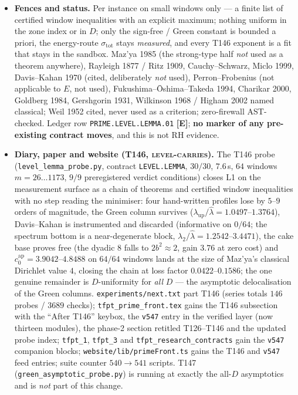 \documentclass[11pt]{article}
\providecommand{\mE}{\textbf{[E]}}\providecommand{\mC}{\textbf{[C]}}
\begin{document}
\begin{itemize}[leftmargin=1.5em]
stays flat (max/min $1.0063$; control: $c_0^{\mathrm{ap}}\times10^{-3}$ breaks the certificate on
every window).
\item \textbf{Fences and status.} Per instance on small windows only --- a finite list of certified
window inequalities with an explicit maximum; nothing uniform in the zone index or in $D$; only the
sign-free / Green constant is bounded a priori, the energy-route $\sigma_{\mathrm{tot}}$ stays
\emph{measured}, and every T146 exponent is a fit that stays in the sandbox. Maz'ya 1985 (the
strong-type half \emph{not} used as a theorem anywhere), Rayleigh 1877 / Ritz 1909, Cauchy--Schwarz,
Miclo 1999, Davis--Kahan 1970 (cited, deliberately \emph{not} used), Perron--Frobenius (not
applicable to $E$, not used), Fukushima--\=Oshima--Takeda 1994, Charikar 2000, Goldberg 1984,
Gershgorin 1931, Wilkinson 1968 / Higham 2002 named classical; Weil 1952 cited, never used as a
criterion; zero-firewall AST-checked. Ledger row \texttt{PRIME.LEVEL.LEMMA.01} \mE; \textbf{no
marker of any pre-existing contract moves}, and this is not RH evidence.
\item \textbf{Diary, paper and website (T146, \textsc{level-carries}).} The T146 probe
(\texttt{level\_lemma\_probe.py}, contract \texttt{LEVEL.LEMMA}, $30/30$, $7.6$\,s, $64$ windows
$m=26\ldots1173$, $9/9$ preregistered verdict conditions) closes L1 on the measurement surface as
a chain of theorems and certified window inequalities with no step reading the minimiser: four
hand-written profiles lose by $5$--$9$ orders of magnitude, the Green column survives
($\lambda_{\mathrm{up}}/\hat\lambda=1.0497$--$1.3764$), Davis--Kahan is instrumented and discarded
(informative on $0/64$; the spectrum bottom is a near-degenerate block,
$\lambda_2/\hat\lambda=1.2542$--$3.4471$), the cake base proves free (the dyadic $8$ falls to
$2b^2\approx2$, gain $3.76$ at zero cost) and
$c_0^{\mathrm{ap}}=3.9042$--$4.8488$ on $64/64$ windows lands at the size of Maz'ya's classical
Dirichlet value $4$, closing the chain at loss factor $0.0422$--$0.1586$; the one genuine remainder
is $D$-uniformity for \emph{all} $D$ --- the asymptotic delocalisation of the Green columns.
\texttt{experiments/next.txt} part T146 (series totals $146$ probes / $3689$ checks);
\texttt{tfpt\_prime\_front.tex} gains the T146 subsection with the ``After T146'' keybox, the
\texttt{v547} entry in the verified layer (now thirteen modules), the phase-2 section retitled
T126--T146 and the updated probe index; \texttt{tfpt\_1}, \texttt{tfpt\_3} and
\texttt{tfpt\_research\_contracts} gain the \texttt{v547} companion blocks;
\texttt{website/lib/primeFront.ts} gains the T146 and \texttt{v547} feed entries; suite counter
$540\to541$ scripts. T147 (\texttt{green\_asymptotic\_probe.py}) is running at exactly the all-$D$
asymptotics and is \emph{not} part of this change.
\end{itemize}
\end{document}
